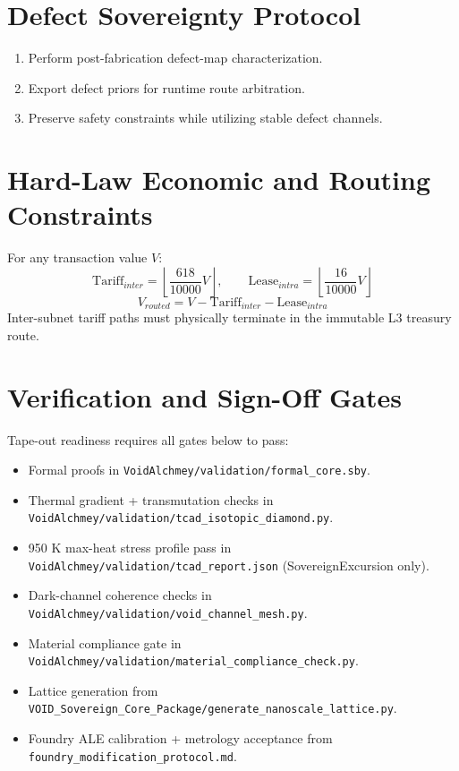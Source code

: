 \documentclass[11pt]{article}
\begin{document}
\section{Defect Sovereignty Protocol}
\begin{enumerate}
  \item Perform post-fabrication defect-map characterization.
  \item Export defect priors for runtime route arbitration.
  \item Preserve safety constraints while utilizing stable defect channels.
\end{enumerate}

\section{Hard-Law Economic and Routing Constraints}
For any transaction value \(V\):
\[
\mathrm{Tariff}_{inter} = \left\lfloor \frac{618}{10000}V \right\rfloor,\qquad
\mathrm{Lease}_{intra} = \left\lfloor \frac{16}{10000}V \right\rfloor
\]
\[
V_{routed} = V - \mathrm{Tariff}_{inter} - \mathrm{Lease}_{intra}
\]
Inter-subnet tariff paths must physically terminate in the immutable L3 treasury route.

\section{Verification and Sign-Off Gates}
Tape-out readiness requires all gates below to pass:
\begin{itemize}
  \item Formal proofs in \texttt{VoidAlchmey/validation/formal\_core.sby}.
  \item Thermal gradient + transmutation checks in \texttt{VoidAlchmey/validation/tcad\_isotopic\_diamond.py}.
  \item 950 K max-heat stress profile pass in \texttt{VoidAlchmey/validation/tcad\_report.json} (SovereignExcursion only).
  \item Dark-channel coherence checks in \texttt{VoidAlchmey/validation/void\_channel\_mesh.py}.
  \item Material compliance gate in \texttt{VoidAlchmey/validation/material\_compliance\_check.py}.
  \item Lattice generation from \texttt{VOID\_Sovereign\_Core\_Package/generate\_nanoscale\_lattice.py}.
  \item Foundry ALE calibration + metrology acceptance from \texttt{foundry\_modification\_protocol.md}.
\end{itemize}
\end{document}
